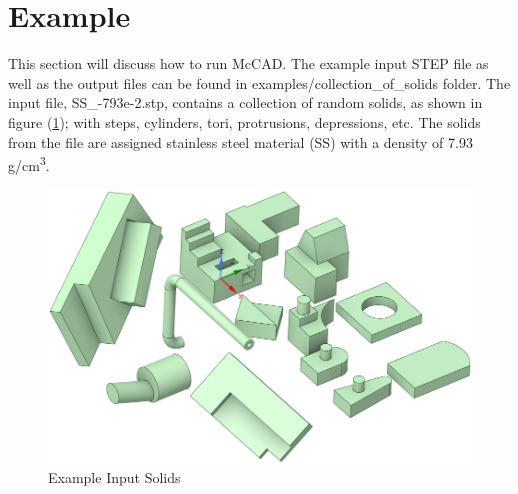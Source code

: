 \documentclass[letterpaper, 12 pt]{report}
\begin{document}
\section{Example} \label{sec:Example}
This section will discuss how to run McCAD. The example input STEP file as well as the output files can be found in examples/collection\_of\_solids folder. The input file, SS\_-793e-2.stp, contains a collection of random solids, as shown in figure (\ref{fig:ExampleSolids}); with steps, cylinders, tori, protrusions, depressions, etc. The solids from the file are assigned stainless steel material (SS) with a density of 7.93 g/cm\textsuperscript{3}.
\begin{figure}[h]
	\centering
	\includegraphics[scale=0.42]{figures/InputSolids.png}
	\caption{Example Input Solids}
	\label{fig:ExampleSolids}
\end{figure}
\end{document}
